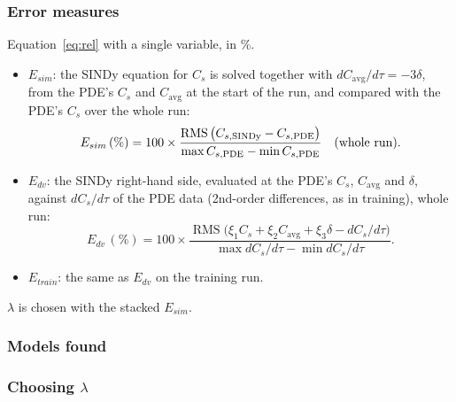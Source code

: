 \documentclass[11pt,a4paper]{article}
\newcommand{\RMS}{\operatorname{RMS}}
\newcommand{\avg}{\mathrm{avg}}
\begin{document}
\subsubsection{Error measures}\label{sec:pde-err}
Equation~\eqref{eq:rel} with a single variable, in \%.
\begin{itemize}
  \item $E_{sim}$: the SINDy equation for $C_s$ is solved together with $dC_\avg/d\tau=-3\delta$, from the PDE's $C_s$ and $C_\avg$ at the start of the run, and compared with the PDE's $C_s$ over the whole run:
  \[
    E_{sim}\,(\%) = 100\times\frac{\RMS\big(C_{s,\rm SINDy}-C_{s,\rm PDE}\big)}{\max C_{s,\rm PDE}-\min C_{s,\rm PDE}}\quad\text{(whole run)}.
  \]
  \item $E_{dv}$: the SINDy right-hand side, evaluated at the PDE's $C_s$, $C_\avg$ and $\delta$, against $dC_s/d\tau$ of the PDE data (2nd-order differences, as in training), whole run:
  \[
    E_{dv}\,(\%) = 100\times\frac{\RMS\big(\xi_1C_s+\xi_2C_\avg+\xi_3\delta - dC_s/d\tau\big)}{\max dC_s/d\tau-\min dC_s/d\tau}.
  \]
  \item $E_{train}$: the same as $E_{dv}$ on the training run.
\end{itemize}
$\lambda$ is chosen with the stacked $E_{sim}$.

\subsubsection{Models found}
\begin{table}[H]\centering\scriptsize\setlength{\tabcolsep}{3.5pt}
\resizebox{\textwidth}{!}{}
\caption{Models found in the $\lambda$ sweep ($10^{-6}$ to $10^3$) and their errors in \%. Each validation column is that model's $E_{sim}$ on that run. $\infty$: the solution grows without bound. The empty model keeps $C_s$ at its starting value. Shaded: the model selected by R4.}
\end{table}

\subsubsection{Choosing $\lambda$}
\begin{table}[H]\centering\scriptsize
\resizebox{\textwidth}{!}{}
\caption{Number of terms of the model selected by R4 for each choice of validation error, with and without step 4 (removal of unstable models). The selection used is $E_{sim}$, stacked.}
\end{table}
\end{document}
